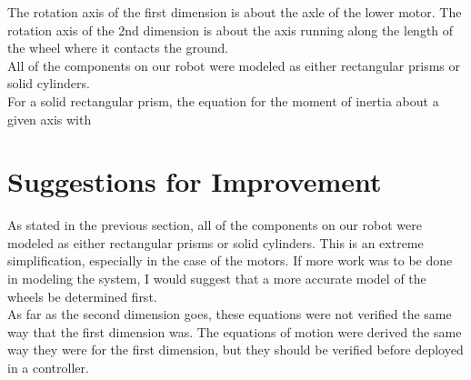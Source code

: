 \documentclass{article}
\begin{document}
The rotation axis of the first dimension is about the axle of the lower motor.  The rotation axis of the 2nd dimension is about the axis running along the length of the wheel where it contacts the ground.\\

All of the components on our robot were modeled as either rectangular prisms or solid cylinders.\\

For a solid rectangular prism, the equation for the moment of inertia about a given axis with 


\newpage
\section{Suggestions for Improvement}
As stated in the previous section, all of the components on our robot were modeled as either rectangular prisms or solid cylinders.  This is an extreme simplification, especially in the case of the motors.  If more work was to be done in modeling the system, I would suggest that a more accurate model of the wheels be determined first.\\

As far as the second dimension goes, these equations were not verified the same way that the first dimension was.  The equations of motion were derived the same way they were for the first dimension, but they should be verified before deployed in a controller.
\end{document}
